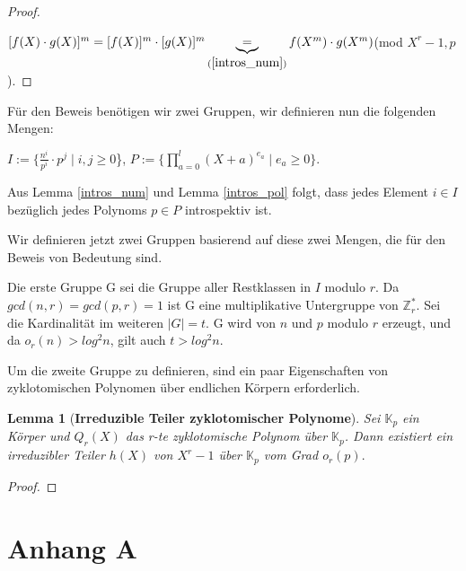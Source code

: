 \documentclass[12pt,oneside]{article}
\newtheorem{lemma}[theorem]{Lemma}
\theoremstyle{remark}
\theoremstyle{definition}
\begin{document}
\begin{proof}\label{intros_pol}
    \centerline{$[f(X) \cdot g(X)]^{m} = [f(X)]^m \cdot [g(X)]^m \underbrace{=}_{(\ref{intros_num})} f(X^m) \cdot g(X^m)$(mod $X^r - 1, p$).}
\end{proof}

Für den Beweis benötigen wir zwei Gruppen, wir definieren nun die folgenden Mengen:\newline\newline
\centerline{\large $ I := \{ \frac{n^i}{p^i} \cdot p^j \mid i,j \geq 0$\},  $P := \{ \prod_{a = 0}^{l} (X + a)^{e_{a}} \mid e_{a} \geq 0 \}$.}\newline\newline
Aus Lemma \ref{intros_num} und Lemma \ref{intros_pol} folgt, dass jedes Element $i \in I$ bezüglich jedes Polynoms $p \in P$ introspektiv ist.\newline\newline

Wir definieren jetzt zwei Gruppen basierend auf diese zwei Mengen, die für den Beweis von Bedeutung sind.\newline\newline

Die erste Gruppe G sei die Gruppe aller Restklassen in $I$ modulo $r$. Da $gcd(n,r) = gcd(p,r) = 1 $ ist G eine multiplikative Untergruppe von $\mathbb{Z}_{r}^{*}$. Sei die Kardinalität im weiteren $ | G | = t $. G wird von $n$ und $p$ modulo $r$ erzeugt, und da $o_{r}(n) > log^2 n$, gilt auch $t > log^2 n$.\newline\newline

Um die zweite Gruppe zu definieren, sind ein paar Eigenschaften von zyklotomischen Polynomen über endlichen Körpern erforderlich.

\begin{lemma}[\textbf{Irreduzible Teiler zyklotomischer Polynome}] Sei $\mathbb{K}_{p}$ ein Körper und $Q_{r}(X)$ das r-te zyklotomische Polynom über $\mathbb{K}_{p}$. Dann existiert ein irreduzibler Teiler $h(X)$ von $X^r - 1$ über $\mathbb{K}_{p}$ vom Grad $o_{r}(p).$
\end{lemma}

\begin{proof}
    
\end{proof}




\clearpage
\lhead{}
\printbibliography
{}


\clearpage
\appendix
\section{Anhang A}


\end{document}

